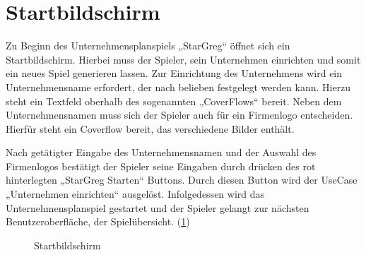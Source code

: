 \section{Startbildschirm}
\label{sec:ui-startbildschirm}

Zu Beginn des Unternehmensplanspiels „StarGreg“ öffnet sich ein Startbildschirm. Hierbei muss der Spieler, sein Unternehmen einrichten und somit ein neues Spiel generieren lassen. Zur Einrichtung des Unternehmens wird ein Unternehmensname erfordert, der nach belieben festgelegt werden kann. Hierzu steht ein Textfeld oberhalb des sogenannten „CoverFlows“ bereit. Neben dem Unternehmensnamen muss sich der Spieler auch für ein Firmenlogo entscheiden. Hierfür steht ein Coverflow bereit, das verschiedene Bilder enthält.
 
Nach getätigter Eingabe des Unternehmensnamen und der Auswahl des Firmenlogos bestätigt der Spieler seine Eingaben durch drücken des rot hinterlegten „StarGreg Starten“ Buttons. Durch diesen Button wird der UseCase „Unternehmen einrichten“ ausgelöst. Infolgedessen wird das Unternehmensplanspiel gestartet und der Spieler gelangt zur nächsten Benutzeroberfläche, der Spielübersicht. (\ref{img:ui-startbildschirm})

\begin{figure}[h]
  \centering
  \caption{Startbildschirm}
  \label{img:ui-startbildschirm}
\end{figure}

\autorende{}
 